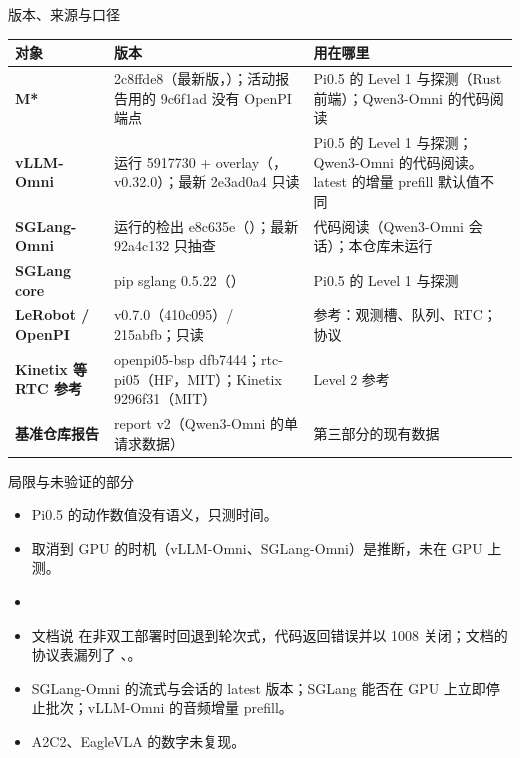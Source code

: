 
\begin{frame}[t]{版本、来源与口径}
\scriptsize
\renewcommand{\arraystretch}{1.05}
\setlength{\tabcolsep}{3pt}
\begin{tabularx}{\textwidth}{>{\bfseries}p{2.3cm} Y Y}
\toprule
{}
对象 & 版本 & 用在哪里 \\
\midrule
M* & 2c8ffde8（最新版，）；活动报告用的 9c6f1ad 没有 OpenPI 端点 & Pi0.5 的 Level 1 与探测（Rust 前端）；Qwen3-Omni 的代码阅读 \\
vLLM-Omni & 运行 5917730 + overlay（，v0.32.0）；最新 2e3ad0a4 只读 & Pi0.5 的 Level 1 与探测；Qwen3-Omni 的代码阅读。latest 的增量 prefill 默认值不同 \\
SGLang-Omni & 运行的检出 e8c635e（）；最新 92a4c132 只抽查 & 代码阅读（Qwen3-Omni 会话）；本仓库未运行 \\
SGLang core & pip sglang 0.5.22（） & Pi0.5 的 Level 1 与探测 \\
LeRobot / OpenPI & v0.7.0（410c095）/ 215abfb；只读 & 参考：观测槽、队列、RTC；协议 \\
Kinetix 等 RTC 参考 & openpi05-bsp dfb7444；rtc-pi05（HF，MIT）；Kinetix 9296f31（MIT） & Level 2 参考 \\
基准仓库报告 & report v2（Qwen3-Omni 的单请求数据） & 第三部分的现有数据 \\
\bottomrule
\end{tabularx}
\par{}
\par{}
\end{frame}

\begin{frame}[t]{局限与未验证的部分}
\scriptsize
\begin{itemize}\setlength\itemsep{1pt}
\item {} Pi0.5 的动作数值没有语义，只测时间。
\item {} 取消到 GPU 的时机（vLLM-Omni、SGLang-Omni）是推断，未在 GPU 上测。
\item {}
\item {} 文档说  在非双工部署时回退到轮次式，代码返回错误并以 1008 关闭；文档的协议表漏列了 、。
\item {} SGLang-Omni 的流式与会话的 latest 版本；SGLang 能否在 GPU 上立即停止批次；vLLM-Omni 的音频增量 prefill。
\item {} A2C2、EagleVLA 的数字未复现。
\end{itemize}
\par{}
\end{frame}
